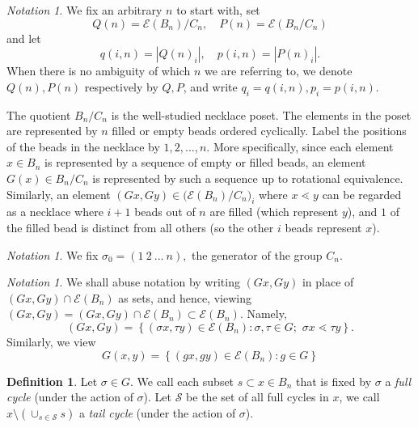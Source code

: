 \documentclass[10 pt]{amsart}
\theoremstyle{plain}
\theoremstyle{definition}
\newtheorem{defn}[thm]{Definition}
\theoremstyle{remark}
\newtheorem{note}[thm]{Notation}
\numberwithin{equation}{section}
\begin{document}
\begin{note} We fix an arbitrary $n$ to start with,  set $$Q(n) =  \mathcal E (B_n)/C_{n}, \quad P(n) =  \mathcal E(B_n/C_{n})$$ and let $$q (i, n) =|Q(n)_i|, \quad p (i, n) =|P(n)_i|. $$  When there is no ambiguity of which $n$ we are referring to, we denote $Q(n), P(n)$ respectively by $Q, P$, and write $q_i = q(i, n), p_i = p (i, n)$.
\end{note}

The quotient $B_n /C_n$ is the well-studied necklace poset. The elements in the poset are represented by $n$ filled or empty beads ordered cyclically. Label the positions of the beads in the necklace by $1, 2, ..., n$. More specifically, since each element $x \in B_n$ is represented by a sequence of empty or filled beads, an element $G(x) \in B_n/C_n$ is represented by such a sequence up to rotational equivalence.  Similarly, an element $(Gx, Gy) \in \big( \mathcal E(B_n)/C_n\big)_{i}$ where $x \lessdot y$ can be regarded as a necklace where $i+1$ beads out of $n$ are filled (which represent $y$), and $1$ of the filled bead is distinct from all others (so the other $i$ beads represent $x$).
 
\begin{note}
We fix $\sigma_0 = (1 \: 2 \: ... \: n),$ the generator of the group $C_n$.
\end{note}


\begin{note}
We shall abuse notation by writing $(Gx, Gy)$ in place of $(Gx, Gy) \cap  \mathcal E(B_n)$ as sets, and hence, viewing $(Gx, Gy) = (Gx, Gy) \cap  \mathcal E(B_n)\subset  \mathcal E(B_n).$ Namely, $$(Gx, Gy) = \left\{ (\sigma x, \tau y) \in  \mathcal E (B_n) : \sigma, \tau \in G; \, \, \sigma x \lessdot \tau y  \right\}.$$ Similarly, we view $$G(x, y) = \left\{ (gx , g y) \in  \mathcal E (B_n) : g \in G \right\} $$
\end{note}

\begin{defn}
Let  $\sigma \in G.$ We call each subset $s \subset x \in B_n$ that is fixed by $\sigma$ a \textit{full cycle} (under the action of $\sigma$). Let $\mathcal S$ be the set of all full cycles in $x$, we call   $ x \setminus \left(\cup_{s \in \mathcal S}  s \right)$ a \textit{tail cycle} (under the action of $\sigma$).  
\end{defn}
\end{document}
